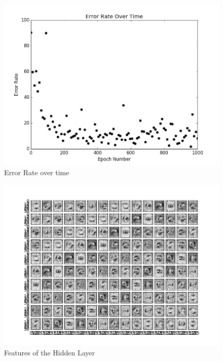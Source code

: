 \documentclass[12pt, letterpaper, twoside]{article}
\begin{document}
\begin{figure}
    \centering
    \includegraphics[scale=0.6]{AEErrorRate.png}
    \caption{Error Rate over time}
\end{figure}

\begin{figure}
    \centering
    \includegraphics[scale=0.6]{features.png}
    \caption{Features of the Hidden Layer}
\end{figure}
\end{document}
